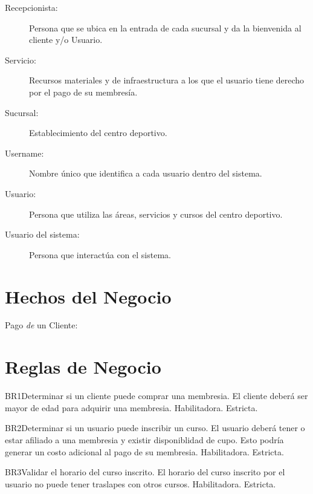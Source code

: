 \begin{description}
	\item[Recepcionista:] Persona que se ubica en la entrada de cada sucursal y da la bienvenida al cliente y/o Usuario.
	\item[Servicio:] Recursos materiales y de infraestructura a los que el usuario tiene derecho por el pago de su membresía.
	\item[Sucursal:] Establecimiento del centro deportivo.
	\item[Username:] Nombre único que identifica a cada usuario dentro del sistema.
	\item[Usuario:] Persona que utiliza las áreas, servicios y cursos del centro deportivo.
	\item[Usuario del sistema:] Persona que interactúa con el sistema. 
		
\end{description}

\section{Hechos del Negocio}

\begin{description}
	\item[Pago {\em de} un Cliente:]
\end{description}

\section{Reglas de Negocio}

\begin{BussinesRule}{BR1}{Determinar si un cliente puede comprar una membresia.} 
	\BRitem[Descripción:] El cliente deberá ser mayor de edad para adquirir una membresia.
	\BRitem[Tipo:] Habilitadora.
	\BRitem[Nivel:] Estricta.
\end{BussinesRule}

\begin{BussinesRule}{BR2}{Determinar si un usuario puede inscribir un curso.}
	\BRitem[Descripción:] El usuario deberá tener o estar afiliado a una membresia y existir disponiblidad de cupo.
Esto podría generar un costo adicional al pago de su membresia.
	\BRitem[Tipo:] Habilitadora.
	\BRitem[Nivel:] Estricta.
\end{BussinesRule}

\begin{BussinesRule}{BR3}{Validar el horario del curso inscrito.}
	\BRitem[Descripción:] El horario del curso inscrito por el usuario no puede tener traslapes con otros cursos.
	\BRitem[Tipo:] Habilitadora.
	\BRitem[Nivel:] Estricta.
\end{BussinesRule}


